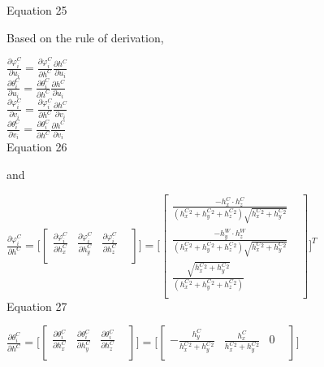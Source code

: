




Equation 25

Based on the rule of derivation, 

$\frac{\partial \varphi _{i}^{C}}{\partial u_{i}}=\frac{\partial 
\varphi _{i}^{C}}{\partial h^{C}}\frac{\partial h^{C}}{\partial u_{i}}$
\\


$\frac{\partial \theta _{i}^{C}}{\partial u_{i}}=\frac{\partial \theta 
_{i}^{C}}{\partial h^{C}}\frac{\partial h^{C}}{\partial u_{i}}$\\


$\frac{\partial \varphi _{i}^{C}}{\partial v_{i}}=\frac{\partial 
\varphi _{i}^{C}}{\partial h^{C}}\frac{\partial h^{C}}{\partial v_{i}}$
\\


$\frac{\partial \theta _{i}^{C}}{\partial v_{i}}=\frac{\partial \theta 
_{i}^{C}}{\partial h^{C}}\frac{\partial h^{C}}{\partial v_{i}}$\\


Equation 26

and

$\frac{\partial \varphi _{i}^{C}}{\partial h^{C}}=\lbrack 
\begin{bmatrix}
\frac{\partial \varphi _{i}^{C}}{\partial h_{x}^{C}} & \frac{\partial 
\varphi _{i}^{C}}{\partial h_{y}^{C}} & \frac{\partial \varphi 
_{i}^{C}}{\partial h_{z}^{C}} & \\
\end{bmatrix}
\rbrack =\lbrack \begin{bmatrix}
\frac{-h_{x}^{C}\cdot 
h_{z}^{C}}{(h_{x}^{C}^{2}+h_{y}^{C}^{2}+h_{z}^{C}^{2})\sqrt{h_{x}^{C}^{2}+h_{y}^{C}^{2}}} 
& \\
\frac{-h_{y}^{W}\cdot 
h_{z}^{W}}{(h_{x}^{C}^{2}+h_{y}^{C}^{2}+h_{z}^{C}^{2})\sqrt{h_{x}^{C}^{2}+h_{y}^{C}^{2}}} 
& \\

\frac{\sqrt{h_{x}^{C}^{2}+h_{y}^{C}^{2}}}{(h_{x}^{C}^{2}+h_{y}^{C}^{2}+h_{z}^{C}^{2})} 
& \\
\end{bmatrix}
\rbrack ^{T}$\\


Equation 27

$\frac{\partial \theta _{i}^{C}}{\partial h^{C}}=\lbrack \begin{bmatrix}
\frac{\partial \theta _{i}^{C}}{\partial h_{x}^{C}} & \frac{\partial 
\theta _{i}^{C}}{\partial h_{y}^{C}} & \frac{\partial \theta 
_{i}^{C}}{\partial h_{z}^{C}} & \\
\end{bmatrix}
\rbrack =\lbrack \begin{bmatrix}
-\frac{h_{y}^{C}}{h_{x}^{C}^{2}+h_{y}^{C}^{2}} & 
\frac{h_{x}^{C}}{h_{x}^{C}^{2}+h_{y}^{C}^{2}} & 0 & \\
\end{bmatrix}
\rbrack $\\


